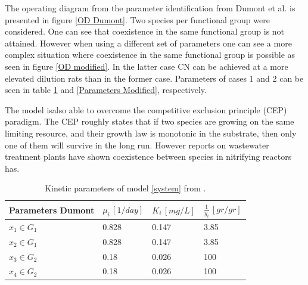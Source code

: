 \documentclass[3p,times]{elsarticle}
\begin{document}
The operating diagram from the parameter identification from Dumont et al. is presented in figure \ref{OD Dumont}. Two species per functional group were considered. One can see that coexistence in the same functional group is not attained. However when using a different set of parameters one can see a more complex situation where coexistence in the same functional group is possible as seen in figure \ref{OD modified}. In the latter case CN can be achieved at a more elevated dilution rats than in the former case. Parameters of cases 1 and 2 can be seen in table \ref{Parameters Dumont} and \ref{Parameters Modified}, respectively. 

The model isalso  able to overcome the  competitive exclusion principle \cite{lobry2017chemostat} (CEP) paradigm. The CEP roughly states that if two species are growing on the same limiting resource, and their growth law is monotonic in the substrate, then only one of them will survive in the long run. However reports on wastewater treatment plants have shown coexistence between species in nitrifying reactors has\cite{Wagner2002}.


\begin{table}[ht]
	\centering
	\begin{tabular}{|l|l|l|l|}
		\hline
		Parameters Dumont & $\mu_i\,[1/day]$ & $K_i\,[mg/L]$ & $\frac{1}{y_i} \, [gr/gr]$ \\ \hline
		$x_1 \in G_1$ & 0.828  & 0.147 & 3.85  \\ \hline
		$x_2\in G_1$ &0.828   & 0.147 &  3.85\\ \hline
		$x_3\in G_2$ & 0.18 & 0.026 &  100 \\ \hline
		$x_4\in G_2$ & 0.18 & 0.026 &  100 \\ \hline
	\end{tabular}
	\caption{Kinetic parameters of model \eqref{system} from \cite{Dumont2016}.}
	\label{Parameters Dumont}
\end{table}
\end{document}
